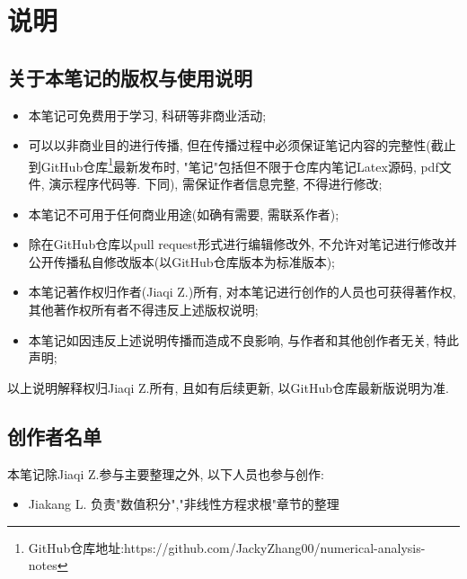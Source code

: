 \chapter{说明}

\section{关于本笔记的版权与使用说明}

\begin{itemize}
    \item 本笔记可免费用于学习, 科研等非商业活动;
    \item 可以以非商业目的进行传播, 但在传播过程中必须保证笔记内容的完整性(截止到GitHub仓库\footnote{GitHub仓库地址:https://github.com/JackyZhang00/numerical-analysis-notes}最新发布时, "笔记"包括但不限于仓库内笔记Latex源码, pdf文件, 演示程序代码等. 下同), 需保证作者信息完整, 不得进行修改;
    \item 本笔记不可用于任何商业用途(如确有需要, 需联系作者);
    \item 除在GitHub仓库以pull request形式进行编辑修改外, 不允许对笔记进行修改并公开传播私自修改版本(以GitHub仓库版本为标准版本);
    \item 本笔记著作权归作者(Jiaqi Z.)所有, 对本笔记进行创作的人员也可获得著作权, 其他著作权所有者不得违反上述版权说明;
    \item 本笔记如因违反上述说明传播而造成不良影响, 与作者和其他创作者无关, 特此声明;
\end{itemize}

以上说明解释权归Jiaqi Z.所有, 且如有后续更新, 以GitHub仓库最新版说明为准.

\section{创作者名单}

本笔记除Jiaqi Z.参与主要整理之外, 以下人员也参与创作:

\begin{itemize}
    \item Jiakang L. 负责"数值积分","非线性方程求根"章节的整理
\end{itemize}